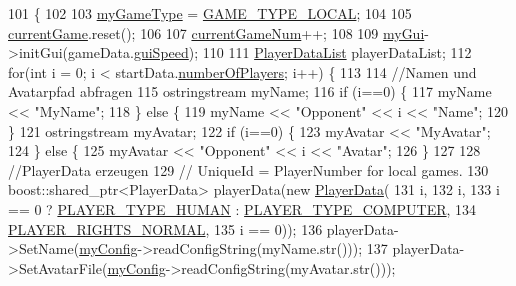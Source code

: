 \begin{DoxyCode}
101 \{
102 
103     \hyperlink{class_session_acf11b7b3982bc3e4c5bbf635d5e98496}{myGameType} = \hyperlink{class_session_a6989c72d21ad19fd7abbd1c8d95d78c1a347a5eef5f0bd9a982bec2ff54a201e7}{GAME\_TYPE\_LOCAL};
104 
105     \hyperlink{class_session_a5c15d5f1be74a30fa167a0af5822113c}{currentGame}.reset();
106 
107     \hyperlink{class_session_a89974964b38a285de9ec954b99b0ee3f}{currentGameNum}++;
108 
109     \hyperlink{class_session_a2725f4b56b109b2e7d75ed780d24fa6d}{myGui}->initGui(gameData.\hyperlink{struct_game_data_a19b38d37fbd225504166856f187f38f3}{guiSpeed});
110 
111     \hyperlink{playerdata_8h_a8232751bca13b3cf3056ce08251f7067}{PlayerDataList} playerDataList;
112     \textcolor{keywordflow}{for}(\textcolor{keywordtype}{int} i = 0; i < startData.\hyperlink{struct_start_data_a962ea391fe81cc9d28ac7ec7ea511afc}{numberOfPlayers}; i++) \{
113 
114         \textcolor{comment}{//Namen und Avatarpfad abfragen}
115         ostringstream myName;
116         \textcolor{keywordflow}{if} (i==0) \{
117             myName << \textcolor{stringliteral}{"MyName"};
118         \} \textcolor{keywordflow}{else} \{
119             myName << \textcolor{stringliteral}{"Opponent"} << i << \textcolor{stringliteral}{"Name"};
120         \}
121         ostringstream myAvatar;
122         \textcolor{keywordflow}{if} (i==0) \{
123             myAvatar << \textcolor{stringliteral}{"MyAvatar"};
124         \} \textcolor{keywordflow}{else} \{
125             myAvatar << \textcolor{stringliteral}{"Opponent"} << i << \textcolor{stringliteral}{"Avatar"};
126         \}
127 
128         \textcolor{comment}{//PlayerData erzeugen}
129         \textcolor{comment}{// UniqueId = PlayerNumber for local games.}
130         boost::shared\_ptr<PlayerData> playerData(\textcolor{keyword}{new} \hyperlink{class_player_data}{PlayerData}(
131                     i,
132                     i,
133                     i == 0 ? \hyperlink{playerdata_8h_abe590f3c9109f404f003d5d7e4f0fccfa6bf6033830c666c7491c430f7ff395a0}{PLAYER\_TYPE\_HUMAN} : 
      \hyperlink{playerdata_8h_abe590f3c9109f404f003d5d7e4f0fccfaafb128e5bf75c3d00a6de25a025f61d6}{PLAYER\_TYPE\_COMPUTER},
134                     \hyperlink{playerdata_8h_ac0c72aca5c5ceabb2abbcd2d2c02aba6a716d25099e5fdf1bad19d51f79bbd7ab}{PLAYER\_RIGHTS\_NORMAL},
135                     i == 0));
136         playerData->SetName(\hyperlink{class_session_a5bfbe43c623b688e7def57e02704033f}{myConfig}->readConfigString(myName.str()));
137         playerData->SetAvatarFile(\hyperlink{class_session_a5bfbe43c623b688e7def57e02704033f}{myConfig}->readConfigString(myAvatar.str()));

\end{DoxyCode}
